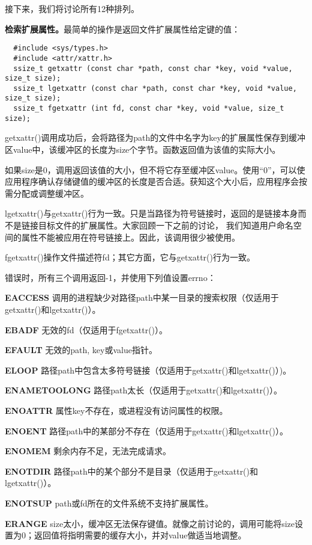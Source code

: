 接下来，我们将讨论所有12种排列。 

\textbf{检索扩展属性。}最简单的操作是返回文件扩展属性给定键的值：

\begin{lstlisting}
  #include <sys/types.h>
  #include <attr/xattr.h>
  ssize_t getxattr (const char *path, const char *key, void *value, size_t size);
  ssize_t lgetxattr (const char *path, const char *key, void *value, size_t size);
  ssize_t fgetxattr (int fd, const char *key, void *value, size_t size);
\end{lstlisting}

getxattr()调用成功后，会将路径为path的文件中名字为key的扩展属性保存到缓冲区value中，该缓冲区的长度为size个字节。函数返回值为该值的实际大小。

如果size是0，调用返回该值的大小，但不将它存至缓冲区value。使用“0”，可以使应用程序确认存储键值的缓冲区的长度是否合适。获知这个大小后，应用程序会按需分配或调整缓冲区。

lgetxattr()与getxattr()行为一致。只是当路径为符号链接时，返回的是链接本身而不是链接目标文件的扩展属性。大家回顾一下之前的讨论， 我们知道用户命名空间的属性不能被应用在符号链接上。因此，该调用很少被使用。

fgetxattr()操作文件描述符fd；其它方面，它与getxattr()行为一致。

错误时，所有三个调用返回-1，并使用下列值设置errno：

\begin{eqlist*}
\item[\textbf{EACCESS}] 调用的进程缺少对路径path中某一目录的搜索权限（仅适用于getxattr()和lgetxattr()）。
\item[\textbf{EBADF}] 无效的fd（仅适用于fgetxattr()）。
\item[\textbf{EFAULT}] 无效的path, key或value指针。
\item[\textbf{ELOOP}] 路径path中包含太多符号链接（仅适用于getxattr()和lgetxattr()）)。
\item[\textbf{ENAMETOOLONG}] 路径path太长（仅适用于getxattr()和lgetxattr()）。
\item[\textbf{ENOATTR}] 属性key不存在，或进程没有访问属性的权限。
\item[\textbf{ENOENT}] 路径path中的某部分不存在（仅适用于getxattr()和lgetxattr()）。
\item[\textbf{ENOMEM}] 剩余内存不足，无法完成请求。
\item[\textbf{ENOTDIR}] 路径path中的某个部分不是目录（仅适用于getxattr()和lgetxattr()）。
\item[\textbf{ENOTSUP}] path或fd所在的文件系统不支持扩展属性。
\item[\textbf{ERANGE}] size太小，缓冲区无法保存键值。就像之前讨论的，调用可能将size设置为0；返回值将指明需要的缓存大小，并对value做适当地调整。
\end{eqlist*}

